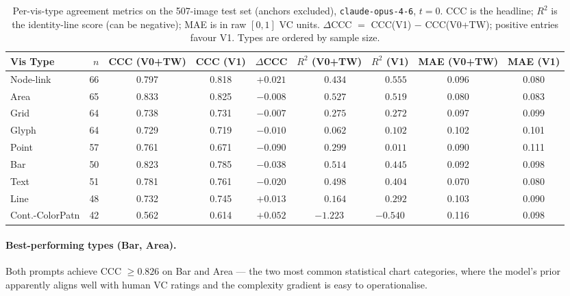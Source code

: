 \begin{table}[t]
  \centering
  \caption{Per-vis-type agreement metrics on the 507-image test set
    (anchors excluded), \texttt{claude-opus-4-6}, $t = 0$. CCC is the
    headline; $R^2$ is the identity-line score (can be negative);
    MAE is in raw $[0,1]$ VC units. $\Delta$CCC $=$ CCC(V1) $-$
    CCC(V0+TW); positive entries favour V1.
    Types are ordered by sample size.}
  \label{tab:fullset-vistype}
  \small
  \begin{tabular*}{\textwidth}{@{\extracolsep{\fill}}lrccccccc@{}}
    \toprule
    Vis Type & $n$ & CCC (V0+TW) & CCC (V1) & $\Delta$CCC
             & $R^2$ (V0+TW) & $R^2$ (V1) & MAE (V0+TW) & MAE (V1) \\
    \midrule
    Node-link       &  66 & 0.797 & 0.818 & $+0.021$          & $\phantom{-}0.434$ & $\phantom{-}0.555$ & 0.096 & 0.080 \\
    Area            &  65 & 0.833 & 0.825 & $-0.008$          & $\phantom{-}0.527$ & $\phantom{-}0.519$ & 0.080 & 0.083 \\
    Grid            &  64 & 0.738 & 0.731 & $-0.007$          & $\phantom{-}0.275$ & $\phantom{-}0.272$ & 0.097 & 0.099 \\
    Glyph           &  64 & 0.729 & 0.719 & $-0.010$          & $\phantom{-}0.062$ & $\phantom{-}0.102$ & 0.102 & 0.101 \\
    Point           &  57 & 0.761 & 0.671 & $-0.090$          & $\phantom{-}0.299$ & $\phantom{-}0.011$ & 0.090 & 0.111 \\
    Bar             &  50 & 0.823 & 0.785 & $-0.038$          & $\phantom{-}0.514$ & $\phantom{-}0.445$ & 0.092 & 0.098 \\
    Text            &  51 & 0.781 & 0.761 & $-0.020$          & $\phantom{-}0.498$ & $\phantom{-}0.404$ & 0.070 & 0.080 \\
    Line            &  48 & 0.732 & 0.745 & $+0.013$          & $\phantom{-}0.164$ & $\phantom{-}0.292$ & 0.103 & 0.090 \\
    Cont.-ColorPatn &  42 & 0.562 & 0.614 & $+0.052$          & $-1.223$           & $-0.540$           & 0.116 & 0.098 \\
    \bottomrule
  \end{tabular*}
\end{table}

\paragraph{Best-performing types (Bar, Area).}
Both prompts achieve CCC $\geq 0.826$ on Bar and Area --- the two most
common statistical chart categories, where the model's prior apparently
aligns well with human VC ratings and the complexity gradient is easy to
operationalise.

